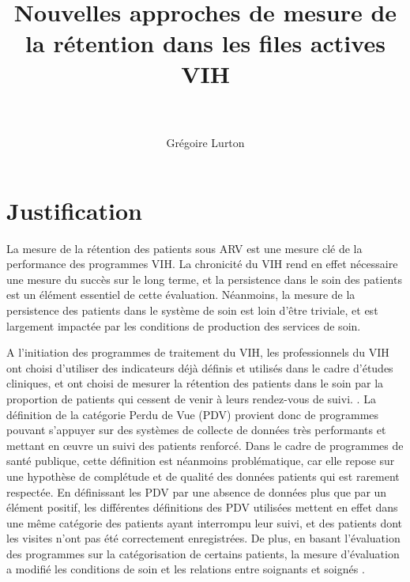 \documentclass[paper=a4, fontsize=11pt]{scrartcl}
\title{
		\usefont{OT1}{bch}{b}{n}
		\normalfont \normalsize \textsc{} \\ [25pt]
		\horrule{0.5pt} \\[0.4cm]
		\huge Nouvelles approches de mesure de la rétention dans les files actives VIH \\
		\horrule{2pt} \\[0.5cm]
}
\author{
		\normalfont 								\normalsize
        Grégoire Lurton\\[-3pt]		\normalsize
}
\date{}
\numberwithin{equation}{section}		%
\numberwithin{figure}{section}			%
\numberwithin{table}{section}				%
\begin{document}
\maketitle

\section{Justification}

La mesure de la rétention des patients sous ARV est une mesure clé de la performance des programmes VIH. La chronicité du VIH rend en effet nécessaire une mesure du succès sur le long terme, et la persistence dans le soin des patients est un élément essentiel de cette évaluation. Néanmoins, la mesure de la persistence des patients dans le système de soin est loin d'être triviale, et est largement impactée par les conditions de production des services de soin.

A l'initiation des programmes de traitement du VIH, les professionnels du VIH ont choisi d'utiliser des indicateurs déjà définis et utilisés dans le cadre d'études cliniques, et ont choisi de mesurer la rétention des patients dans le soin par la proportion de patients qui cessent de venir à leurs rendez-vous de suivi\cite{ioannidis_predictors_1999,lebouche_incidence_2006,moh_incidence_2007}.
. La définition de la catégorie Perdu de Vue (PDV) provient donc de programmes pouvant s'appuyer sur des systèmes de collecte de données très performants et mettant en \oe uvre un suivi des patients renforcé. Dans le cadre de programmes de santé publique, cette définition est néanmoins problématique, car elle repose sur une hypothèse de complétude et de qualité des données patients qui est rarement respectée. En définissant les PDV par une absence de données plus que par un élément positif, les différentes définitions des PDV utilisées  mettent en effet dans une même catégorie des patients ayant interrompu leur suivi, et des patients dont les visites n'ont pas été correctement enregistrées. De plus, en basant l'évaluation des programmes sur la catégorisation de certains patients, la mesure d'évaluation a modifié les conditions de soin et les relations entre soignants et soignés \cite{carillon_les_2011}.
\end{document}

